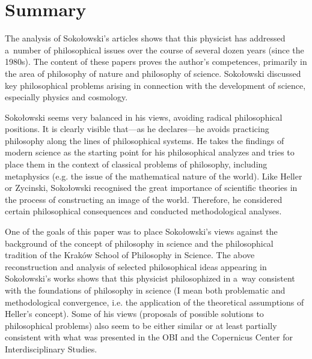 \documentclass[%
  manuscript=article,
  year=2024,
  volume=77,
  doi=00000.000,
]{zfn}
\begin{document}
\section{Summary}

The analysis of Sokołowski's articles shows that this physicist has addressed a~number of philosophical issues over the course of several dozen years (since the 1980s). The content of these papers proves the author's competences, primarily in the area of philosophy of nature and philosophy of science. Sokołowski discussed key philosophical problems arising in connection with the development of science, especially physics and cosmology.



Sokołowski seems very balanced in his views, avoiding radical philosophical positions. It is clearly visible that---as he declares---he avoids practicing philosophy along the lines of philosophical systems. He takes the findings of modern science as the starting point for his philosophical analyzes and tries to place them in the context of classical problems of philosophy, including metaphysics (e.g. the issue of the mathematical nature of the world). Like Heller or Zycinski, Sokołowski recognised the great importance of scientific theories in the process of constructing an image of the world. Therefore, he considered certain philosophical consequences and conducted methodological analyses.



One of the goals of this paper was to place Sokołowski's views against the background of the concept of philosophy in science and the philosophical tradition of the Kraków School of Philosophy in Science. The above reconstruction and analysis of selected philosophical ideas appearing in Sokołowski's works shows that this physicist philosophized in a~way consistent with the foundations of philosophy in science (I mean both problematic and methodological convergence, i.e. the application of the theoretical assumptions of Heller's concept). Some of his views (proposals of possible solutions to philosophical problems) also seem to be either similar or at least partially consistent with what was presented in the OBI and the Copernicus Center for Interdisciplinary Studies.
\end{document}
